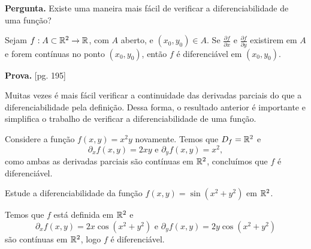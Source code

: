 \textbf{Pergunta. } Existe uma maneira mais fácil de verificar a diferenciabilidade de uma função?

\begin{theorem}
    Sejam \(f:A\subset\mathbb{R}^2\to\mathbb{R}\), com \(A\) aberto, e \((x_0,y_0)\in A\). Se \(\frac{\partial f}{\partial x}\) e \(\frac{\partial f}{\partial y}\) existirem em \(A\) e forem contínuas no ponto \((x_0,y_0)\), então \(f\) é diferenciável em \((x_0,y_0)\).
\end{theorem}
\textbf{Prova. } \cite{guidorizzi}[pg. 195]

Muitas vezes é mais fácil verificar a continuidade das derivadas parciais do que a diferenciabilidade pela definição. Dessa forma, o resultado anterior é importante e simplifica o trabalho de verificar a diferenciabilidade de uma função.

\begin{example}
    Considere a função \(f(x,y) = x^2 y\) novamente. Temos que \(D_f = \mathbb{R}^2\) e \[\partial_x f(x,y) = 2xy \text{ e } \partial_y f(x,y) = x^2,\] como ambas as derivadas parciais são contínuas em \(\mathbb{R}^2\), concluímos que \(f\) é diferenciável.
\end{example}

\begin{example}
    Estude a diferenciabilidade da função \(f(x,y) = \sin(x^2 + y^2)\) em \(\mathbb{R}^2\).

    Temos que \(f\) está definida em \(\mathbb{R}^2\) e \[\partial_x f(x,y) = 2x\cos(x^2+y^2) \text{ e } \partial_y f(x,y) = 2y\cos(x^2+y^2)\] são contínuas em \(\mathbb{R}^2\), logo \(f\) é diferenciável.
\end{example}

